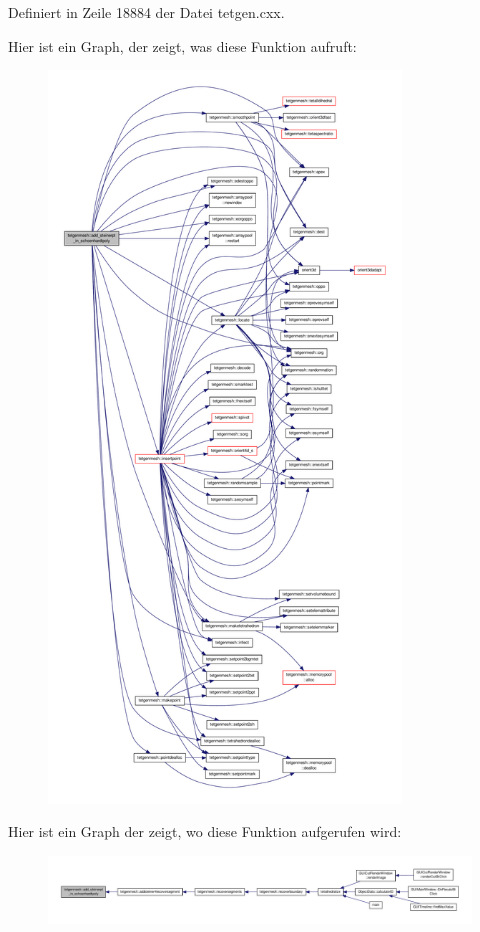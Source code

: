 Definiert in Zeile 18884 der Datei tetgen.\-cxx.



Hier ist ein Graph, der zeigt, was diese Funktion aufruft\-:\nopagebreak
\begin{figure}[H]
\begin{center}
\leavevmode
\includegraphics[height=550pt]{classtetgenmesh_acb5fc751eaa4a4ddffbebedfa7b7382a_cgraph}
\end{center}
\end{figure}




Hier ist ein Graph der zeigt, wo diese Funktion aufgerufen wird\-:\nopagebreak
\begin{figure}[H]
\begin{center}
\leavevmode
\includegraphics[width=350pt]{classtetgenmesh_acb5fc751eaa4a4ddffbebedfa7b7382a_icgraph}
\end{center}
\end{figure}


